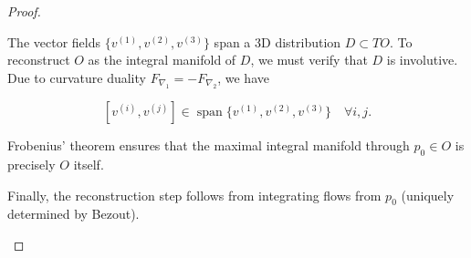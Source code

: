 \documentclass[10pt,a4paper]{amsart}
\begin{document}
\begin{proof}
\begin{enumerate}
\medskip 
The vector fields $\{v^{(1)}, v^{(2)}, v^{(3)}\}$  span a 3D distribution $D\subset TO$. To reconstruct $O$ as the integral manifold of $D$, we must verify that $D$ is involutive. Due to curvature duality $F_{\nabla_1} = -F_{\nabla_2}$, we have 

\[
[v^{(i)}, v^{(j)}] \in \operatorname{span} \{ v^{(1)}, v^{(2)}, v^{(3)}\} \quad \forall i,j. 
\]

Frobenius' theorem ensures that the maximal integral manifold through $p_0\in O$ is precisely $O$ itself.

\medskip 
Finally, the reconstruction step follows from integrating flows from $p_0$ (uniquely determined by Bezout).  
\end{enumerate}
\end{proof}
\end{document}
